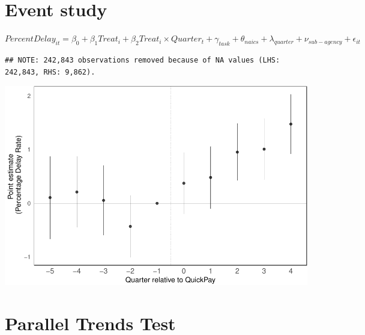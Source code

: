 \documentclass[
]{article}
\begin{document}
\hypertarget{event-study}{%
\section{Event study}\label{event-study}}

\(PercentDelay_{it}=\beta_0 + \beta_1 Treat_i + \beta_2 Treat_i \times Quarter_t + \gamma_{task} + \theta_{naics}+\lambda_{quarter}+\nu_{sub-agency}+\epsilon_{it}\)

\begin{verbatim}
## NOTE: 242,843 observations removed because of NA values (LHS: 242,843, RHS: 9,862).
\end{verbatim}

\includegraphics{qp_first_pc_delay-2_files/figure-latex/event_study-1.pdf}

\hypertarget{parallel-trends-test}{%
\section{Parallel Trends Test}\label{parallel-trends-test}}
\end{document}
